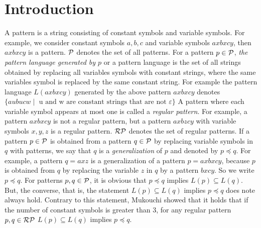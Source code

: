\section{Introduction}

A pattern is a string consisting of constant symbols and variable symbols.
For example, we consider constant symbols $a,b,c$ and variable symbols $axbxcy$,  then $axbxcy$ is a pattern.
$\mathcal{P}$ denotes the set of all patterns.
For a pattern $p\in \mathcal{P}$, {\it the pattern language generated by $p$} or a pattern language is the set of all strings obtained by replacing all variables symbols with constant strings, where the same variables symbol is replaced by the same constant string.
For example the pattern language $L(axbxcy)$ generated by the above pattern $axbxcy$ denotes $\{ aubucw \mid \mbox{  u and w are constant strings that are not $\varepsilon$} \}$
A pattern where each variable symbol appears at most one is called a {\it regular pattern}. 
For example, a pattern $axbxcy$ is not a regular pattern, but a pattern $axbzcy$ with variable symbols $x,y,z$ is a regular pattern.
$\mathcal{RP}$ denotes the set of regular patterns.
If a pattern $p\in \mathcal{P}$ is obtained from a pattern $q\in\mathcal{P}$ by replacing variable symbols in $q$ with patterns, we say that $q$ is a {\it generalization} of $p$ and denoted by $p\preceq q$.
For example, a pattern $q=axz$ is a generalization of a pattern $p=axbxcy$, because $p$ is obtained from $q$ by replacing the variable $z$ in $q$ by a pattern $bxcy$.
So we write $p\preceq q$.
For patterns $p,q\in \mathcal{P}$, it is obvious that $p\preceq q$ implies $L(p)\subseteq L(q)$.
But, the converse, that is, the statement $L(p)\subseteq L(q)$ implies $p\preceq q$ does note always hold.
Contrary to this statement, Mukouchi\cite{Mukouchi1991} showed that it holds that if the number of constant symbols is greater than 3, for any regular pattern $p,q\in \mathcal{RP}$ $L(p)\subseteq L(q)$ implies $p\preceq q$.


